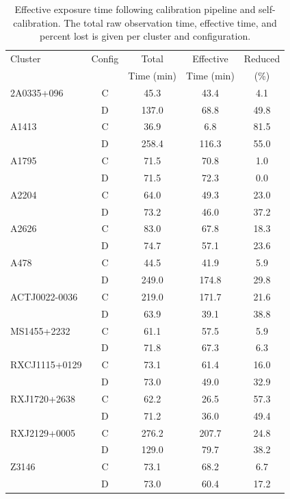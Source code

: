 \begin{table}
    \centering
    \caption{Effective exposure time following calibration pipeline and self-calibration. The total raw observation time, effective time, and percent lost is given per cluster and configuration.}
    \label{tab:eff_exposure}
    \begin{tabular}{lcccc}
        \toprule
        Cluster & Config & Total & Effective & Reduced \\
        & & Time (min) & Time (min) & (\%) \\
        \midrule
        2A0335+096      & C &   45.3 &   43.4 &   4.1\\
                        & D &  137.0 &   68.8 &  49.8\\
        \addlinespace[0.5em]
        A1413           & C &   36.9 &    6.8 &  81.5\\
                        & D &  258.4 &  116.3 &  55.0\\
        \addlinespace[0.5em]
        A1795           & C &   71.5 &   70.8 &   1.0\\
                        & D &   71.5 &   72.3 &   0.0\\
        \addlinespace[0.5em]
        A2204           & C &   64.0 &   49.3 &  23.0\\
                        & D &   73.2 &   46.0 &  37.2\\
        \addlinespace[0.5em]
        A2626           & C &   83.0 &   67.8 &  18.3\\
                        & D &   74.7 &   57.1 &  23.6\\
        \addlinespace[0.5em]
        A478            & C &   44.5 &   41.9 &   5.9\\
                        & D &  249.0 &  174.8 &  29.8\\
        \addlinespace[0.5em]
        ACTJ0022-0036   & C &  219.0 &  171.7 &  21.6\\
                        & D &   63.9 &   39.1 &  38.8\\
        \addlinespace[0.5em]
        MS1455+2232     & C &   61.1 &   57.5 &   5.9\\
                        & D &   71.8 &   67.3 &   6.3\\
        \addlinespace[0.5em]
        RXCJ1115+0129   & C &   73.1 &   61.4 &  16.0\\
                        & D &   73.0 &   49.0 &  32.9\\
        \addlinespace[0.5em]
        RXJ1720+2638    & C &   62.2 &   26.5 &  57.3\\
                        & D &   71.2 &   36.0 &  49.4\\
        \addlinespace[0.5em]
        RXJ2129+0005    & C &  276.2 &  207.7 &  24.8\\
                        & D &  129.0 &   79.7 &  38.2\\
        \addlinespace[0.5em]
        Z3146           & C &   73.1 &   68.2 &   6.7\\
                        & D &   73.0 &   60.4 &  17.2\\
        \bottomrule
    \end{tabular}
\end{table}
